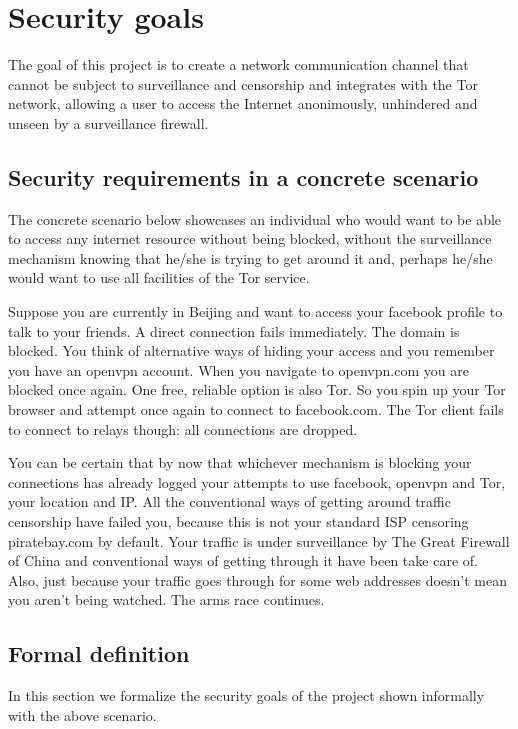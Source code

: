 \documentclass[11pt]{book} %
\begin{document}
\chapter{Security goals}
\label{sec:goals}

The goal of this project is to create a network communication channel that cannot be subject to surveillance and censorship and integrates with the Tor network, allowing a user to access the Internet anonimously, unhindered and unseen by a surveillance firewall.

\section{Security requirements in a concrete scenario}

The concrete scenario below showcases an individual who would want to be able to access any internet resource without being blocked, without the surveillance mechanism knowing that he/she is trying to get around it and, perhaps he/she would want to use all facilities of the Tor service.

Suppose you are currently in Beijing and want to access your facebook profile to talk to your friends. A direct connection fails immediately. The domain is blocked. You think of alternative ways of hiding your access and you remember you have an openvpn account. When you navigate to openvpn.com you are blocked once again. One free, reliable option is also Tor. So you spin up your Tor browser and attempt once again to connect to facebook.com. The Tor client fails to connect to relays though: all connections are dropped.  \citep*{web:blockedInChina}

You can be certain that by now that whichever mechanism is blocking your connections has already logged your attempts to use facebook, openvpn and Tor, your location and IP.  All the conventional ways of getting around traffic censorship have failed you, because this is not your standard ISP censoring piratebay.com by default. Your traffic is under surveillance by The Great Firewall of China and conventional ways of getting through it have been take care of. Also, just because your traffic goes through for some web addresses doesn't mean you aren't being watched. The arms race continues.


\section{Formal definition}

In this section we formalize the security goals of the project shown informally with the above scenario.
\end{document}
